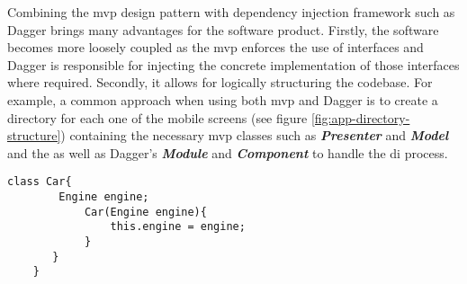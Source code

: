         
    Combining the \gls{mvp} design pattern with dependency injection framework such as Dagger brings many advantages for the software product. Firstly, the software becomes more loosely coupled as the \gls{mvp} enforces the use of interfaces and Dagger is responsible for injecting the concrete implementation of those interfaces where required. Secondly, it allows for logically structuring the codebase. For example, a common approach when using both \gls{mvp} and Dagger is to create a directory for each one of the mobile screens (see figure \ref{fig:app-directory-structure}) containing the necessary \gls{mvp} classes such as \textit{\textbf{Presenter}} and \textit{\textbf{Model}} and the as well as Dagger's \textit{\textbf{Module}} and \textit{\textbf{Component}} to handle the \gls{di} process.
    
\begin{lstlisting}[caption= DI example, label=di-car-example,frame=tlrbr,basicstyle=\small,captionpos=b]
    class Car{
        Engine engine;
            Car(Engine engine){
                this.engine = engine;
            }
       }
    }
\end{lstlisting}
